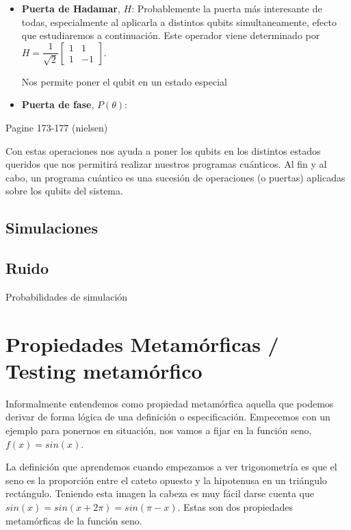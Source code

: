 \begin{itemize}
    \item \textbf{Puerta de Hadamar}, $H$: Probablemente la puerta más interesante de todas, especialmente al aplicarla a distintos qubits simultaneamente, efecto que estudiaremos a continuación. Este operador viene determinado por $H = \dfrac{1}{\sqrt{2}} \begin{bmatrix} 1 & 1\\1 & -1 \end{bmatrix}$. \newline
     
    Nos permite poner el qubit en un estado especial
     
    \item \textbf{Puerta de fase}, $P(\theta)$:
 \end{itemize}
 
 Pagine 173-177 (nielsen)

\vspace{20pt}
 Con estas operaciones nos ayuda a poner los qubits en los distintos estados queridos que nos permitirá realizar nuestros programas cuánticos. Al fin y al cabo, un programa cuántico es una sucesión de operaciones (o puertas) aplicadas sobre los qubits del sistema. \newline

\subsection{Simulaciones}

\subsection{Ruido}
Probabilidades de simulación

\section{Propiedades Metamórficas / Testing metamórfico}

Informalmente entendemos como propiedad metamórfica aquella que podemos derivar de forma lógica de una definición o especificación. Empecemos con un ejemplo para ponernos en situación, nos vamos a fijar en la función seno, $f(x)=sin(x)$.\newline

La definición que aprendemos cuando empezamos a ver trigonometría es que el seno es la proporción entre el cateto opuesto y la hipotenusa en un triángulo rectángulo. Teniendo esta imagen la cabeza es muy fácil darse cuenta que $sin(x)=sin(x + 2\pi)=sin(\pi-x)$. Estas son dos propiedades metamórficas de la función seno. \newline

